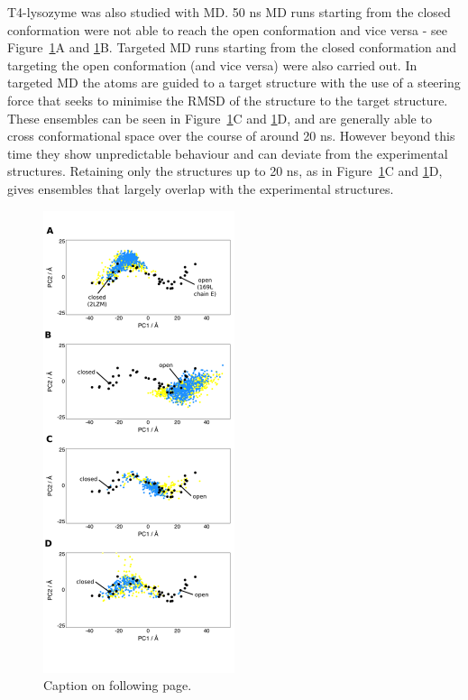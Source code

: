 T4-lysozyme was also studied with MD.
50 ns MD runs starting from the closed conformation were not able to reach the open conformation and vice versa - see Figure~\ref{fig:t4l_md}A and \ref{fig:t4l_md}B.
Targeted MD runs starting from the closed conformation and targeting the open conformation (and vice versa) were also carried out.
In targeted MD the atoms are guided to a target structure with the use of a steering force that seeks to minimise the RMSD of the structure to the target structure.
These ensembles can be seen in Figure~\ref{fig:t4l_md}C and \ref{fig:t4l_md}D, and are generally able to cross conformational space over the course of around 20 ns.
However beyond this time they show unpredictable behaviour and can deviate from the experimental structures.
Retaining only the structures up to 20 ns, as in Figure~\ref{fig:t4l_md}C and \ref{fig:t4l_md}D, gives ensembles that largely overlap with the experimental structures.


\begin{figure}
\centering

\includegraphics[width=0.5\textwidth]{figures/t4l_md/t4l_md}

\caption[T4-lysozyme ensembles generated using MD and targeted MD]
{Caption on following page.}

\label{fig:t4l_md}
\end{figure}

